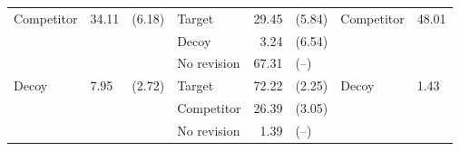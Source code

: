\begin{table}
\begin{tabular}{llllrlll}
\hspace{1em}Competitor & 34.11 & (6.18) & Target & 29.45 & (5.84) & Competitor & 48.01\\
\hspace{1em} &  &  & Decoy & 3.24 & (6.54) &  & \\
\hspace{1em} &  &  & No revision & 67.31 & (--) &  & \\
\hspace{1em}Decoy & 7.95 & (2.72) & Target & 72.22 & (2.25) & Decoy & 1.43\\
\hspace{1em} &  &  & Competitor & 26.39 & (3.05) &  & \\
\hspace{1em} &  &  & No revision & 1.39 & (--) &  & \\
\bottomrule
\end{tabular}
\end{table}

